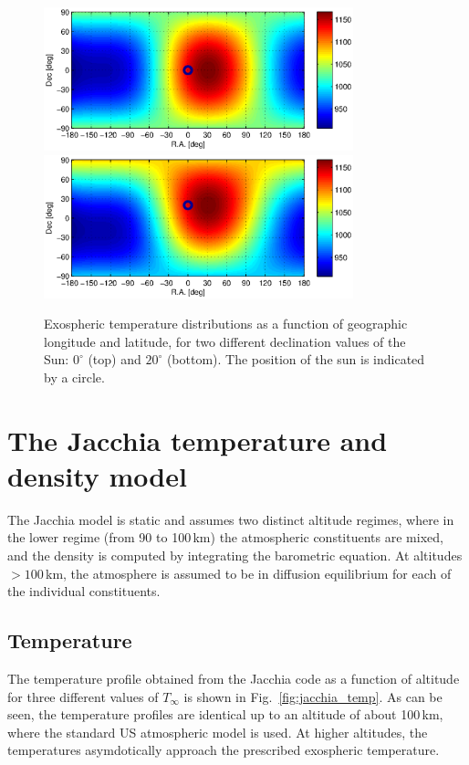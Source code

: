 \documentclass[a4paper]{article}
\begin{document}
\begin{figure}
\includegraphics[width=0.8\textwidth]{exotemp1.eps}
\includegraphics[width=0.8\textwidth]{exotemp2.eps}
\caption{Exospheric temperature distributions as a function of geographic longitude and latitude, for two different declination values of the Sun: $0^\circ$ (top) and $20^\circ$ (bottom). The position of the sun is indicated by a circle.}
\label{fig:t_infty}
\end{figure}

\section{The Jacchia temperature and density model}
The Jacchia model is static and assumes two distinct altitude regimes, where in the lower regime (from 90 to 100\,km) the atmospheric constituents are mixed, and the density is computed by integrating the barometric equation. At altitudes $> 100$\,km, the atmosphere is assumed to be in diffusion equilibrium for each of the individual constituents.

\subsection{Temperature}
The temperature profile obtained from the Jacchia code as a function of altitude for three different values of $T_\infty$ is shown in Fig.~\ref{fig:jacchia_temp}. As can be seen, the temperature profiles are identical up to an altitude of about 100\,km, where the standard US atmospheric model is used. At higher altitudes, the temperatures asymdotically approach the prescribed exospheric temperature.
\end{document}
